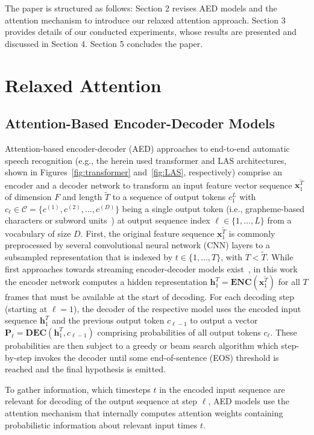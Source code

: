\documentclass{article}
\newcommand{\VEC}[1]{\mathbf{#1}}          \newcommand{\VECG}[1]{\boldmath{#1}}     \newcommand{\MAT}[1]{\mathbf{#1}}          \newcommand{\MATG}[1]{\boldsymbol{#1}}
\begin{document}
The paper is structured as follows: Section 2 revises AED models and the attention mechanism to introduce our relaxed attention approach. Section 3 provides details of our conducted experiments, whose results are presented and discussed in Section 4. Section 5 concludes the paper. 
\vspace{-2mm}
\section{Relaxed Attention}	\vspace{-3mm}
\subsection{Attention-Based Encoder-Decoder Models}\vspace{-2mm}
Attention-based encoder-decoder (AED) approaches to end-to-end automatic speech recognition (e.g., the herein used transformer and LAS architectures, shown in Figures~\ref{fig:transformer} and~\ref{fig:LAS}, respectively) comprise an encoder and a decoder network to transform an input feature vector sequence $\VEC{x}_1^{\tilde{T}}$ of dimension $F$ and length $\tilde{T} $ to a sequence of output tokens $c_1^L$ with $c_{\ell}\!\in\!\mathcal{C}\!=\!\{c^{(1)},c^{(2)},\dots,c^{(D)}\}$ being a single output token (i.e., grapheme-based characters or subword units~\cite{Kudo2018}) at output sequence index $\ell\in\{1,\dots,L\}$ from a vocabulary of size $D$. First, the original feature sequence $\VEC{x}_1^{\tilde{T}}$ is commonly preprocessed by several convolutional neural network (CNN) layers to a subsampled representation that is indexed by $t\!\in\!\{1,\dots,T\}$, with $T\!<\!\tilde{T}$. While first approaches towards streaming encoder-decoder models exist~\cite{Kim2019b,Moritz2020}, in this work the encoder network computes a hidden representation $\VEC{h}_1^T\!=\!\mathbf{ENC}(\VEC{x}_1^{\tilde{T}})$ for all $T$ frames that must be available at the start of decoding. For each decoding step (starting at $\ell\!=\!1$), the decoder of the respective model uses the encoded input sequence $\VEC{h}_1^T$ and the previous output token $c_{\ell-1}$ to output a vector $\mathbf{P}_\ell=\mathbf{DEC}(\mathbf{h}_1^T,c_{\ell-1})$ comprising probabilities of all output tokens $c_{\ell}$. These probabilities are then subject to a greedy or beam search algorithm which step-by-step invokes the decoder until some end-of-sentence (EOS) threshold is reached and the final hypothesis is emitted. 

To gather information, which timesteps $t$ in the encoded input sequence are relevant for decoding of the output sequence at step $\ell$, AED models use the attention mechanism that internally computes attention weights containing probabilistic information about relevant input times $t$. 
\end{document}
